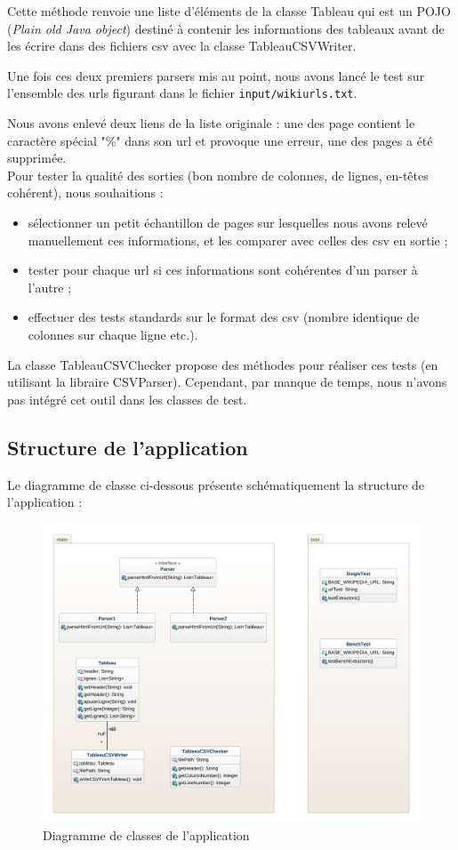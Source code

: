 \documentclass[french]{article}
\begin{document}
Cette méthode renvoie une liste d'éléments de la classe Tableau qui est un POJO (\textit{Plain old Java object}) destiné à contenir les informations des tableaux avant de les écrire dans des fichiers csv avec la classe TableauCSVWriter.

Une fois ces deux premiers parsers mis au point, nous avons lancé le test sur l'ensemble des urls figurant dans le fichier \texttt{input/wikiurls.txt}.

Nous avons enlevé deux liens de la liste originale : une des page contient le caractère spécial "\%" dans son url et provoque une erreur, une des pages a été supprimée.\\

Pour tester la qualité des sorties (bon nombre de colonnes, de lignes, en-têtes cohérent), nous souhaitions :
\begin{itemize}
	\item sélectionner un petit échantillon de pages sur lesquelles nous avons relevé manuellement ces informations, et les comparer avec celles des csv en sortie ;
	\item tester pour chaque url si ces informations sont cohérentes d'un parser à l'autre ;
	\item effectuer des tests standards sur le format des csv (nombre identique de colonnes sur chaque ligne etc.).
\end{itemize} 

La classe TableauCSVChecker propose des méthodes pour réaliser ces tests (en utilisant la libraire CSVParser). Cependant, par manque de temps, nous n'avons pas intégré cet outil dans les classes de test.

\subsection{Structure de l'application}

Le diagramme de classe ci-dessous présente schématiquement la structure de l'application :

\begin{figure}[h!]
	\centering
	\includegraphics[width=\textwidth]{images/class-diagram.png}
	\caption{Diagramme de classes de l'application}
	\label{fig:class-diagram}
\end{figure}
\end{document}
